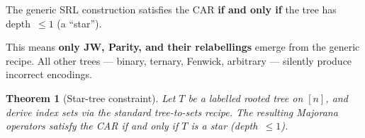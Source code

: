 \documentclass[11pt,a4paper]{article}
\newtheorem{theorem}{Theorem}
\theoremstyle{definition}
\begin{document}
\begin{found}
The generic SRL construction satisfies the CAR \textbf{if and only if}
the tree has depth~$\le 1$ (a ``star'').

\medskip

This means \textbf{only JW, Parity, and their relabellings} emerge
from the generic recipe.  All other trees --- binary, ternary, Fenwick,
arbitrary --- silently produce incorrect encodings.
\end{found}

\begin{theorem}[Star-tree constraint]
\label{thm:star-tree}
Let $T$ be a labelled rooted tree on $[n]$, and derive index sets via
the standard tree-to-sets recipe.  The resulting Majorana operators
satisfy the CAR if and only if $T$ is a star (depth~$\le 1$).
\end{theorem}
\end{document}
